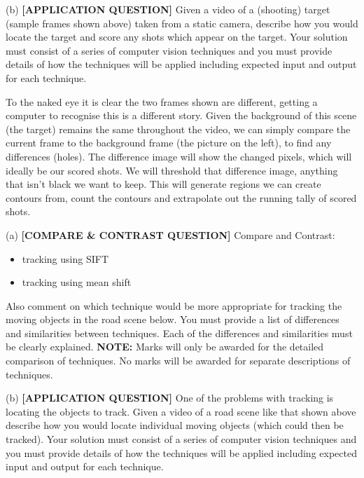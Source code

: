 \begin{tcolorbox}[title=Question]
  (b) \textbf{[APPLICATION QUESTION]} Given a video of a (shooting) target (sample frames shown above) taken from a static camera, describe how you would locate the target and score any shots which appear on the target. Your solution must consist of a series of computer vision techniques and you must provide details of how the techniques will be applied including expected input and output for each technique.
  \begin{flushright}
    [15 marks]
  \end{flushright}
\end{tcolorbox}
To the naked eye it is clear the two frames shown are different, getting a computer to recognise this is a different story. Given the background of this scene (the target) remains the same throughout the video, we can simply compare the current frame to the background frame (the picture on the left), to find any differences (holes). The difference image will show the changed pixels, which will ideally be our scored shots. We will threshold that difference image, anything that isn't black we want to keep. This will generate regions we can create contours from, count the contours and extrapolate out the running tally of scored shots.


\newpage
{}
\begin{tcolorbox}[title=Question]
  (a) \textbf{[COMPARE \& CONTRAST QUESTION]} Compare and Contrast:
  \begin{itemize}
    \item tracking using SIFT
    \item tracking using mean shift
  \end{itemize}
  Also comment on which technique would be more appropriate for tracking the moving objects in the road scene below. You must provide a list of differences and similarities between techniques. Each of the differences and similarities must be clearly explained. \textbf{NOTE:} Marks will only be awarded for the detailed comparison of techniques. No marks will be awarded for separate descriptions of techniques.
  \begin{flushright}
    [30 marks]
  \end{flushright}
\end{tcolorbox}

\begin{tcolorbox}[title=Question]
  (b) \textbf{[APPLICATION QUESTION]} One of the problems with tracking is locating the objects to track. Given a video of a road scene like that shown above describe how you would locate individual moving objects (which could then be tracked). Your solution must consist of a series of computer vision techniques and you must provide details of how the techniques will be applied including expected input and output for each technique.
  \begin{flushright}
    [20 marks]
  \end{flushright}
\end{tcolorbox}

